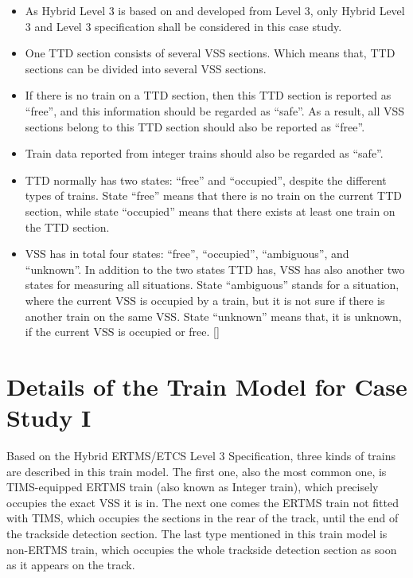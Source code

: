 \documentclass[article,dr=phil,type=drfinal,colorback,accentcolor=tud9c]{tudthesis}
\begin{document}
  \begin{itemize}
  	
  	\item 
  	As Hybrid Level 3 is based on and developed from Level 3, only Hybrid Level 3 and Level 3 specification shall be considered in this case study.
  	
  	\item
  	One TTD section consists of several VSS sections. Which means that, TTD sections can be divided into several VSS sections.
  	
  	\item
  	If there is no train on a TTD section, then this TTD section is reported as ``free'', and this information should be regarded as ``safe''. As a result, all VSS sections belong to this TTD section should also be reported as ``free''.
  	
  	\item
  	Train data reported from integer trains should also be regarded as ``safe''. 
  	
  	\item
  	TTD normally has two states: ``free'' and ``occupied'', despite the different types of trains. State ``free'' means that there is no train on the current TTD section, while state ``occupied'' means that there exists at least one train on the TTD section.
  	
  	\item 
  	VSS has in total four states: ``free'', ``occupied'', ``ambiguous'', and ``unknown''. In addition to the two states TTD has, VSS has also another two states for measuring all situations. State ``ambiguous'' stands for a situation, where the current VSS is occupied by a train, but it is not sure if there is another train on the same VSS. State ``unknown'' means that, it is unknown, if the current VSS is occupied or free. []
  	
  \end{itemize}
  

  \section{Details of the Train Model for Case Study I}
  
  Based on the Hybrid ERTMS/ETCS Level 3 Specification, three kinds of trains are described in this train model. The first one, also the most common one, is TIMS-equipped ERTMS train (also known as Integer train), which precisely occupies the exact VSS it is in. The next one comes the ERTMS train not fitted with TIMS, which occupies the sections in the rear of the track, until the end of the trackside detection section. The last type mentioned in this train model is non-ERTMS train, which occupies the whole trackside detection section as soon as it appears on the track.
  
\end{document}
